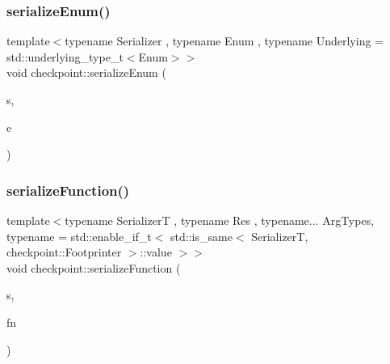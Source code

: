 \mbox{\label{namespacecheckpoint_a5f368cb543eec78bb608a68fe2401562}} 
\subsubsection{\texorpdfstring{serialize\+Enum()}{serializeEnum()}}
{\footnotesize\ttfamily template$<$typename Serializer , typename Enum , typename Underlying  = std\+::underlying\+\_\+type\+\_\+t$<$\+Enum$>$$>$ \\
void checkpoint\+::serialize\+Enum (\begin{DoxyParamCaption}\item[{\hyperlink{structcheckpoint_1_1_serializer}{Serializer} \&}]{s,  }\item[{Enum \&}]{e }\end{DoxyParamCaption})}

\mbox{\label{namespacecheckpoint_a4161978e6d6de385d942cbcbe659817a}} 
\subsubsection{\texorpdfstring{serialize\+Function()}{serializeFunction()}}
{\footnotesize\ttfamily template$<$typename SerializerT , typename Res , typename... Arg\+Types, typename  = std\+::enable\+\_\+if\+\_\+t$<$    std\+::is\+\_\+same$<$      Serializer\+T,      checkpoint\+::\+Footprinter    $>$\+::value  $>$$>$ \\
void checkpoint\+::serialize\+Function (\begin{DoxyParamCaption}\item[{SerializerT \&}]{s,  }\item[{std\+::function$<$ Res(Arg\+Types...)$>$ \&}]{fn }\end{DoxyParamCaption})}

\mbox{\label{namespacecheckpoint_a99092baac18b33d03b1bb47ed1f2d7fa}} 
